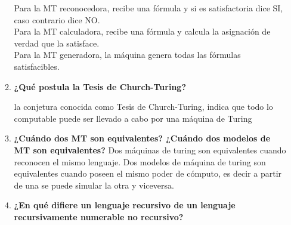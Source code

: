 \documentclass{article}
\begin{document}
\begin{enumerate}
\begin{enumerate}
Para la MT reconocedora, recibe una fórmula y si es satisfactoria dice SI, caso contrario
dice NO.\\
Para la  MT calculadora, recibe una fórmula y calcula la asignación de
verdad que la satisface.\\
Para la MT generadora, la máquina genera todas las fórmulas satisfacibles.
\item \textbf{¿Qué postula la Tesis de Church-Turing?}

la conjetura conocida como Tesis de Church-Turing, indica que todo lo computable puede ser llevado a
cabo por una máquina de Turing

\item \textbf{¿Cuándo dos MT son equivalentes? ¿Cuándo dos modelos de MT son equivalentes?}
Dos máquinas de turing son equivalentes cuando reconocen el mismo lenguaje. Dos modelos de
máquina de turing son equivalentes cuando poseen el mismo poder de cómputo, es decir a partir de una
se puede simular la otra y viceversa.
\item \textbf{¿En qué difiere un lenguaje recursivo de un lenguaje recursivamente numerable no recursivo?}


\end{enumerate}
\end{enumerate}
\end{document}
